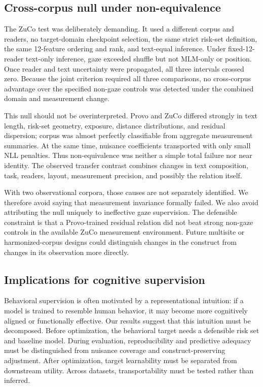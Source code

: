 \documentclass[11pt]{article}
\begin{document}
\subsection{Cross-corpus null under non-equivalence}

The ZuCo test was deliberately demanding. It used a different corpus and readers, no target-domain checkpoint selection, the same strict risk-set definition, the same 12-feature ordering and rank, and text-equal inference. Under fixed-12-reader text-only inference, gaze exceeded shuffle but not MLM-only or position. Once reader and text uncertainty were propagated, all three intervals crossed zero. Because the joint criterion required all three comparisons, no cross-corpus advantage over the specified non-gaze controls was detected under the combined domain and measurement change.

This null should not be overinterpreted. Provo and ZuCo differed strongly in text length, risk-set geometry, exposure, distance distributions, and residual dispersion; corpus was almost perfectly classifiable from aggregate measurement summaries. At the same time, nuisance coefficients transported with only small NLL penalties. Thus non-equivalence was neither a simple total failure nor near identity. The observed transfer contrast combines changes in text composition, task, readers, layout, measurement precision, and possibly the relation itself.

With two observational corpora, those causes are not separately identified. We therefore avoid saying that measurement invariance formally failed. We also avoid attributing the null uniquely to ineffective gaze supervision. The defensible constraint is that a Provo-trained residual relation did not beat strong non-gaze controls in the available ZuCo measurement environment. Future multisite or harmonized-corpus designs could distinguish changes in the construct from changes in its observation more directly.

\subsection{Implications for cognitive supervision}

Behavioral supervision is often motivated by a representational intuition: if a model is trained to resemble human behavior, it may become more cognitively aligned or functionally effective. Our results suggest that this intuition must be decomposed. Before optimization, the behavioral target needs a defensible risk set and baseline model. During evaluation, reproducibility and predictive adequacy must be distinguished from nuisance coverage and construct-preserving adjustment. After optimization, target learnability must be separated from downstream utility. Across datasets, transportability must be tested rather than inferred.
\end{document}
